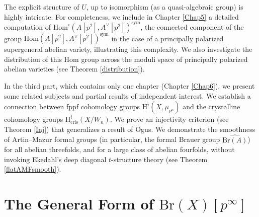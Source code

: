 \documentclass[a4paper,12pt,twoside]{report}
\newtheorem*{theorem*}{Theorem}
\newcommand{\Q}{\mathbb{Q}}
\newcommand{\Z}{\mathbb{Z}}
\newcommand{\cris}{\mathrm{cris}}
\newcommand{\Br}{\mathrm{Br}}
\newcommand{\NS}{\mathrm{NS}}
\newcommand{\HH}{\mathrm{H}}
\newcommand{\Hom}{\mathrm{Hom}}
\begin{document}
The explicit structure of $U$, up to isomorphism (as a quasi-algebraic group) is highly intricate. 
For completeness, we include in Chapter \ref{Chap5} a detailed computation of $\Hom^{\circ}(A[p^2], A^{\vee}[p^2])^{\mathrm{sym}}$, 
the connected component of the group $\Hom(A[p^2], A^{\vee}[p^2])^{\mathrm{sym}}$
in the case of a principally polarized supergeneral abelian variety, 
illustrating this complexity. We also investigate the distribution of this Hom group across the moduli 
space of principally polarized abelian varieties (see Theorem \ref{distribution}).

In the third part, which contains only one chapter (Chapter \ref{Chap6}),
we present some related subjects and partial results of independent interest.
We establish a connection between fppf cohomology groups $\HH^i(X,\mu_{p^n})$ and the crystalline cohomology groups $\HH^i_{\cris}(X/W_n)$. 
We prove an injectivity criterion (see Theorem \ref{Inj}) that generalizes a result of Ogus.
We demonstrate the smoothness of Artin--Mazur formal groups (in particular, the formal Brauer group $\widehat{\Br(A)}$) for all abelian threefolds, and for a large class of abelian fourfolds, 
without invoking Ekedahl's deep diagonal $t$-structure theory (see Theorem \ref{flatAMFsmooth}). 


\part{The General Form of $\Br(X)[p^\infty]$}\label{Part1}







\end{document}
